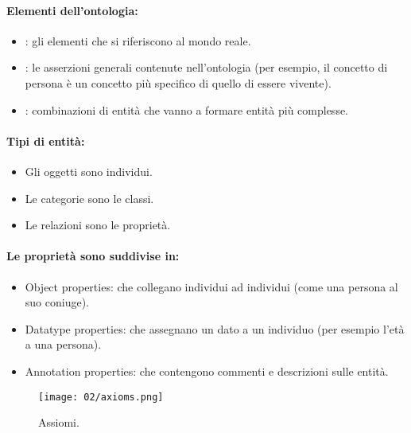 \paragraph{Elementi dell'ontologia:}

\begin{itemize}
  \item {}: gli elementi che si riferiscono al mondo reale. 
  \item {}: le asserzioni generali contenute nell’ontologia
(per esempio, il concetto di persona è un concetto più
specifico di quello di essere vivente). 
\item {}: combinazioni di entità che vanno a
formare entità più complesse.
\end{itemize}

\paragraph{Tipi di entità:}

\begin{itemize}
  \item Gli oggetti sono individui. 
  \item Le categorie sono le classi. 
  \item Le relazioni sono le proprietà.
\end{itemize}

\paragraph{Le proprietà sono suddivise in:}

\begin{itemize}
  \item Object properties: che collegano individui ad individui (come una
persona al suo coniuge).
\item Datatype properties: che assegnano un dato a un individuo (per
esempio l’età a una persona). 
\item Annotation properties: che contengono commenti e descrizioni sulle
entità.
\end{itemize}


\begin{figure}[h]
    \centering
    \texttt{[image: 02/axioms.png]}
    \caption{Assiomi.}
\end{figure}







